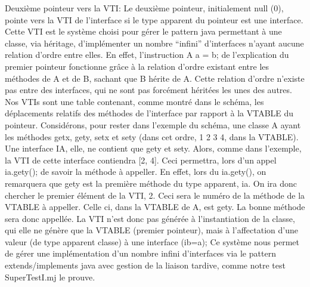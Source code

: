 Deuxième pointeur vers la VTI:
Le deuxième pointeur, initialement null (0), pointe vers la VTI de l'interface si le type apparent du pointeur est une interface. Cette VTI est le système choisi pour gérer le pattern java permettant à une classe, via héritage, d'implémenter un nombre ``infini'' d'interfaces n'ayant aucune relation d'ordre entre elles. En effet, l'instruction A a = b; de l'explication du premier pointeur fonctionne grâce à la relation d'ordre existant entre les méthodes de A et de B, sachant que B hérite de A. Cette relation d'ordre n'existe pas entre des interfaces, qui ne sont pas forcément héritées les unes des autres.
Nos VTIs sont une table contenant, comme montré dans le schéma, les déplacements relatifs des méthodes de l'interface par rapport à la VTABLE du pointeur. Considérons, pour rester dans l'exemple du schéma, une classe A ayant les méthodes getx, gety, setx et sety (dans cet ordre, 1 2 3 4, dans la VTABLE). Une interface IA, elle, ne contient que gety et sety. Alors, comme dans l'exemple, la VTI de cette interface contiendra [2, 4]. Ceci permettra, lors d'un appel ia.gety(); de savoir la méthode à appeller. En effet, lors du ia.gety(), on remarquera que gety est la première méthode du type apparent, ia. On ira donc chercher le premier élément de la VTI, 2. Ceci sera le numéro de la méthode de la VTABLE à appeller. Celle ci, dans la VTABLE de A, est gety. La bonne méthode sera donc appellée. 
La VTI n'est donc pas générée à l'instantiation de la classe, qui elle ne génère que la VTABLE (premier pointeur), mais à l'affectation d'une valeur (de type apparent classe) à une interface (ib=a); Ce système nous permet de gérer une implémentation d'un nombre infini d'interfaces via le pattern extends/implements java avec gestion de la liaison tardive, comme notre test SuperTestI.mj le prouve. 



